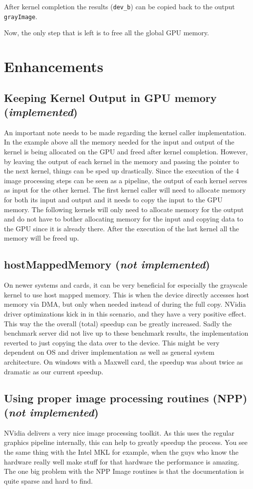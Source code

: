 \documentclass[final]{report}
\begin{document}
After kernel completion the results (\texttt{dev\_b}) can be copied back to the output \texttt{grayImage}.


Now, the only step that is left is to free all the global GPU memory.

\section{Enhancements}
\subsection{Keeping Kernel Output in GPU memory (\textit{implemented})}
An important note needs to be made regarding the kernel caller implementation.
In the example above all the memory needed for the input and output of the kernel is being allocated on the GPU and freed after kernel completion.
However, by leaving the output of each kernel in the memory and passing the pointer to the next kernel, things can be sped up drastically.
Since the execution of the 4 image processing steps can be seen as a pipeline, the output of each kernel serves as input for the other kernel.
The first kernel caller will need to allocate memory for both its input and output and it needs to copy the input to the GPU memory.
The following kernels will only need to allocate memory for the output and do not have to bother allocating memory for the input and copying data to the GPU since it is already there.
After the execution of the last kernel all the memory will be freed up.

\subsection{hostMappedMemory (\textit{not implemented})}
On newer systems and cards, it can be very beneficial for especially the grayscale kernel to use host mapped memory.
This is when the device directly accesses host memory via DMA, but only when needed instead of during the full copy.
NVidia driver optimizations kick in in this scenario, and they have a very positive effect.
This way the the overall (total) speedup can be greatly increased.
Sadly the benchmark server did not live up to these benchmark results, the implementation reverted to just copying the data over to the device.
This might be very dependent on OS and driver implementation as well as general system architecture.
On windows with a Maxwell card, the speedup was about twice as dramatic as our current speedup.

\subsection{Using proper image processing routines (NPP) (\textit{not implemented})}
NVidia delivers a very nice image processing toolkit.
As this uses the regular graphics pipeline internally, this can help to greatly speedup the process.
You see the same thing with the Intel MKL for example, when the guys who know the hardware really well make stuff for that hardware the performance is amazing.
The one big problem with the NPP Image routines is that the documentation is quite sparse and hard to find.
\end{document}
